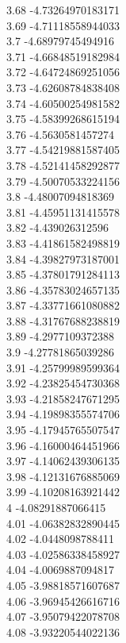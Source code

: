 {3.68	-4.73264970183171\\
3.69	-4.71118558944033\\
3.7	-4.68979745494916\\
3.71	-4.66848519182984\\
3.72	-4.64724869251056\\
3.73	-4.62608784838408\\
3.74	-4.60500254981582\\
3.75	-4.58399268615194\\
3.76	-4.5630581457274\\
3.77	-4.54219881587405\\
3.78	-4.52141458292877\\
3.79	-4.50070533224156\\
3.8	-4.48007094818369\\
3.81	-4.45951131415578\\
3.82	-4.439026312596\\
3.83	-4.41861582498819\\
3.84	-4.39827973187001\\
3.85	-4.37801791284113\\
3.86	-4.35783024657135\\
3.87	-4.33771661080882\\
3.88	-4.31767688238819\\
3.89	-4.2977109372388\\
3.9	-4.27781865039286\\
3.91	-4.25799989599364\\
3.92	-4.23825454730368\\
3.93	-4.21858247671295\\
3.94	-4.19898355574706\\
3.95	-4.17945765507547\\
3.96	-4.16000464451966\\
3.97	-4.14062439306135\\
3.98	-4.12131676885069\\
3.99	-4.10208163921442\\
4	-4.08291887066415\\
4.01	-4.06382832890445\\
4.02	-4.0448098788411\\
4.03	-4.02586338458927\\
4.04	-4.0069887094817\\
4.05	-3.98818571607687\\
4.06	-3.96945426616716\\
4.07	-3.95079422078708\\
4.08	-3.93220544022136\\
}
